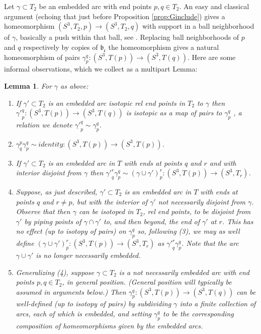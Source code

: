 \documentclass[12pt]{amsart}
\newtheorem{lemma}[thm]{Lemma}
\newcommand{\frb}{\mathfrak{b}}
\newcommand{\frc}{\mbox{$\mathfrak{c}$}}
\begin{document}
     Let $\gamma \subset T_2$ be an embedded arc with end points $p, q \in T_2$.  An easy and classical argument (echoing that just before Proposition \ref{prop:Ginclude}) gives a homeomorphism $(S^3, T_2, p) \to (S^3, T_2, q)$ with support in a ball neighborhood of $\gamma$, basically a push within that ball, see \cite[Homogeneity Lemma]{Mi}.  Replacing ball neighborhoods of $p$ and $q$ respectively by copies of $\frb_{\frc}$ the homeomorphism gives a natural homeomorphism of pairs $\gamma^q_p: (S^3, T(p)) \to (S^3, T(q))$.  Here are some informal observations, which we collect as a multipart Lemma:
\begin{lemma} \label{lemma:gammapq} For $\gamma$ as above:
\begin{enumerate} 
\item If $\gamma' \subset T_2$ is an embedded arc isotopic rel end points in $T_2$ to $\gamma$ then 
    ${\gamma'}^q_p: (S^3, T(p)) \to (S^3, T(q))$ is isotopic as a map of pairs to $\gamma^q_p$
, a relation we denote ${\gamma'}^q_p\sim \gamma^q_p$.  
\item $ \gamma^p_q \gamma^q_p \sim identity: (S^3, T(p)) \to (S^3, T(p))$.
\item If $\gamma' \subset T_2$ is an embedded arc in $T$ with ends at points $q$ and $r$ and with interior disjoint from $\gamma$ then ${\gamma'}^r_q \gamma^q_p\sim (\gamma \cup \gamma')^r_p: (S^3, T(p)) \to (S^3, T_r)$.  

\item Suppose, as just described, $\gamma' \subset T_2$ is an embedded arc in $T$ with ends at points $q$ and $r \neq p$, but with the interior of $\gamma'$ {\em not necessarily} disjoint from $\gamma$.  Observe that then $\gamma$ can be isotoped in $T_2$, rel end points, to be disjoint from $\gamma'$ by piping points of $\gamma \cap \gamma'$ to, and then beyond, the end of $\gamma'$ at $r$.  This has no effect (up to isotopy of pairs) on $\gamma^q_p$ so, following (3), we may as well {\em define} $(\gamma \cup \gamma')^r_p: (S^3, T(p)) \to (S^3, T_r)$ as $ {\gamma'}^r_q \gamma^q_p$.  Note that the arc $  \gamma \cup \gamma'$ is no longer necessarily embedded.

\item Generalizing (4), suppose $\gamma \subset T_2$ is a {\em not necessarily embedded} arc with end points $p, q \in T_2$, in general position. (General position will typically be assumed in arguments below.) Then $\gamma^q_p: (S^3, T(p)) \to (S^3, T(q))$ can be well-defined (up to isotopy of pairs) by subdividing $\gamma$ into a finite collection of arcs, each of which is embedded, and setting $\gamma^q_p$ to be the corresponding composition of homeomorphisms given by the embedded arcs.


\end{enumerate}
\end{lemma}
\end{document}
